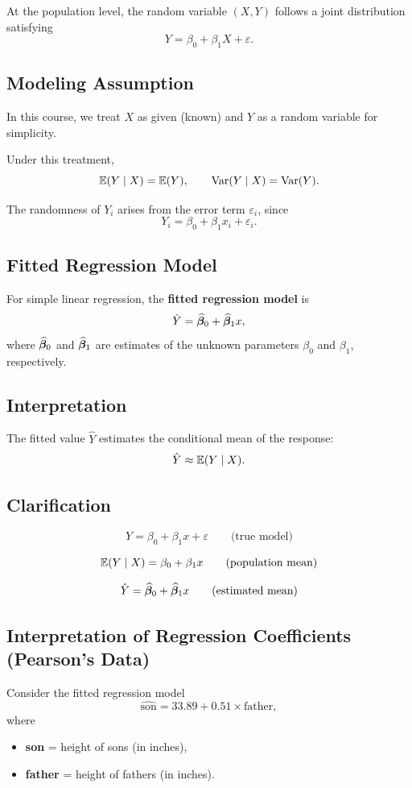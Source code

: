 At the population level, the random variable $(X, Y)$ follows a joint distribution satisfying
\[
Y = \beta_0 + \beta_1 X + \varepsilon.
\]

\subsection{Modeling Assumption}

In this course, we treat $X$ as given (known) and $Y$ as a random variable for simplicity.

Under this treatment,
\[
\mathbb{E}(Y \mid X) = \mathbb{E}(Y),
\qquad
\operatorname{Var}(Y \mid X) = \operatorname{Var}(Y).
\]

The randomness of $Y_i$ arises from the error term $\varepsilon_i$, since
\[
Y_i = \beta_0 + \beta_1 x_i + \varepsilon_i.
\]

\subsection{Fitted Regression Model}

For simple linear regression, the \textbf{fitted regression model} is
\[
\hat{Y} = \widehat{\boldsymbol{\beta}}_0 + \widehat{\boldsymbol{\beta}}_1 x,
\]
where $\widehat{\boldsymbol{\beta}}_0$ and $\widehat{\boldsymbol{\beta}}_1$ are estimates of the unknown parameters $\beta_0$ and $\beta_1$, respectively.

\subsection{Interpretation}

The fitted value $\hat{Y}$ estimates the conditional mean of the response:
\[
\hat{Y} \approx \mathbb{E}(Y \mid X).
\]

\subsection{Clarification}

\[
Y = \beta_0 + \beta_1 x + \varepsilon
\qquad \text{(true model)}
\]

\[
\mathbb{E}(Y \mid X) = \beta_0 + \beta_1 x
\qquad \text{(population mean)}
\]

\[
\hat{Y} = \widehat{\boldsymbol{\beta}}_0 + \widehat{\boldsymbol{\beta}}_1 x
\qquad \text{(estimated mean)}
\]

\subsection{Interpretation of Regression Coefficients (Pearson's Data)}

Consider the fitted regression model
\[
\widehat{\text{son}} = 33.89 + 0.51 \times \text{father},
\]
where
\begin{itemize}
    \item \textbf{son} = height of sons (in inches),
    \item \textbf{father} = height of fathers (in inches).
\end{itemize}

